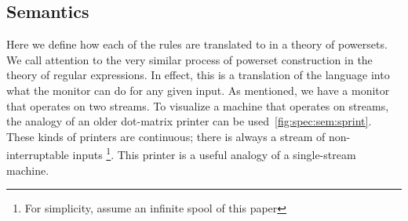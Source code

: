 \documentclass[sigconf,usenames,dvipsnames,svgnames,table]{acmart}
\def \sysname {\textsc{G2}\xspace}
\begin{document}
    \subsection{Semantics}\label{sec:spec:sem}
      Here we define how each of the rules are translated to in a theory of powersets.
      We call attention to the very similar process of powerset construction in the theory of regular expressions.
      In effect, this is a translation of the language into what the monitor can do for any given input.
      As mentioned, we have a monitor that operates on two streams.
      To visualize a machine that operates on streams, the analogy of an older dot-matrix printer can be used~\ref{fig:spec:sem:sprint}.
      These kinds of printers are continuous; there is always a stream of non-interruptable inputs 
      \footnote{For simplicity, assume an infinite spool of this paper}.
      This printer is a useful analogy of a single-stream machine.
      \par

\end{document}

